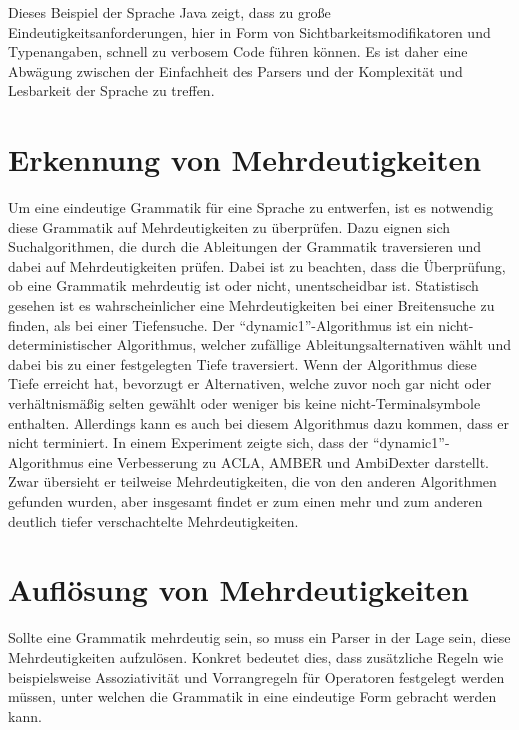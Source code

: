\documentclass[runningheads]{llncs}
\begin{document}
	Dieses Beispiel der Sprache Java zeigt, dass zu große Eindeutigkeitsanforderungen,
	hier in Form von Sichtbarkeitsmodifikatoren und Typenangaben, schnell zu verbosem Code führen können.
	Es ist daher eine Abwägung zwischen der Einfachheit des Parsers und der Komplexität und Lesbarkeit der Sprache zu treffen.


	\section{Erkennung von Mehrdeutigkeiten}\label{sec:erkennung-von-mehrdeutigkeiten}

	Um eine eindeutige Grammatik für eine Sprache zu entwerfen,
	ist es notwendig diese Grammatik auf Mehrdeutigkeiten zu überprüfen.
	Dazu eignen sich Suchalgorithmen, die durch die Ableitungen der Grammatik traversieren
	und dabei auf Mehrdeutigkeiten prüfen.
	Dabei ist zu beachten, dass die Überprüfung, ob eine Grammatik mehrdeutig ist oder nicht,
	unentscheidbar ist.\cite{hopcroft2006introduction}
	Statistisch gesehen ist es wahrscheinlicher eine Mehrdeutigkeiten bei einer Breitensuche zu finden,
	als bei einer Tiefensuche.\cite{springer2013}
	Der ``dynamic1''-Algorithmus\cite{springer2013} ist ein nicht-deterministischer Algorithmus,
	welcher zufällige Ableitungsalternativen wählt und dabei bis zu einer festgelegten Tiefe traversiert.
	Wenn der Algorithmus diese Tiefe erreicht hat, bevorzugt er Alternativen, welche zuvor noch gar nicht oder
	verhältnismäßig selten gewählt oder weniger bis keine nicht-Terminalsymbole enthalten.
	Allerdings kann es auch bei diesem Algorithmus dazu kommen, dass er nicht terminiert.
	In einem Experiment\cite{springer2013} zeigte sich,
	dass der  ``dynamic1''-Algorithmus eine Verbesserung zu ACLA, AMBER und AmbiDexter darstellt.
	Zwar übersieht er teilweise Mehrdeutigkeiten, die von den anderen Algorithmen gefunden wurden,
	aber insgesamt findet er zum einen mehr und zum anderen deutlich tiefer verschachtelte Mehrdeutigkeiten.

	\section{Auflösung von Mehrdeutigkeiten}\label{sec:auflosung-von-mehrdeutigkeiten}

	Sollte eine Grammatik mehrdeutig sein, so muss ein Parser in der Lage sein, diese Mehrdeutigkeiten aufzulösen.
	Konkret bedeutet dies, dass zusätzliche Regeln
	wie beispielsweise Assoziativität und Vorrangregeln für Operatoren festgelegt werden müssen,
	unter welchen die Grammatik in eine eindeutige Form gebracht werden kann.
\end{document}
